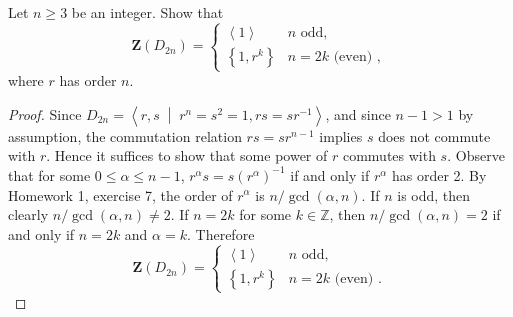 \documentclass[10pt]{amsart}
\newcommand{\cntr}[1]{\mathbf{Z}\left(#1\right)}
\begin{document}
\begin{thm}
  Let $n \geq 3$ be an integer.
  Show that 
  $$\cntr{D_{2n}} = \left\{\begin{array}{ll}
  \left<1\right> & n \text{ odd},\\
  \left\{1, r^k\right\} & n = 2k \text{ (even) },
  \end{array}\right.$$
  where $r$ has order $n$.
  \begin{proof}
    Since $D_{2n} = \left<r,s \;\middle\vert\; r^n = s^2 = 1, rs = sr^{-1} \right>$, and since $n - 1 > 1$ by assumption, the commutation relation $rs = sr^{n-1}$ implies $s$ does not commute with $r$.
    Hence it suffices to show that some power of $r$ commutes with $s$.
    Observe that for some $0 \leq \alpha \leq n-1$, $r^\alpha s = s(r^\alpha)^{-1}$ if and only if $r^\alpha$ has order 2.
    By Homework 1, exercise 7, the order of $r^\alpha$ is $n/\gcd(\alpha,n)$.
    If $n$ is odd, then clearly $n/\gcd(\alpha,n) \not = 2$.
    If $n = 2k$ for some $k \in \mathbb{Z}$, then $n/\gcd(\alpha,n)= 2$ if and only if $n = 2k$ and $\alpha = k$.
    Therefore   
    $$\cntr{D_{2n}} = \left\{\begin{array}{ll}
    \left<1\right> & n \text{ odd},\\
    \left\{1, r^k\right\} & n = 2k \text{ (even) }.
    \end{array}\right.$$
  \end{proof}
\end{thm}
\end{document}
